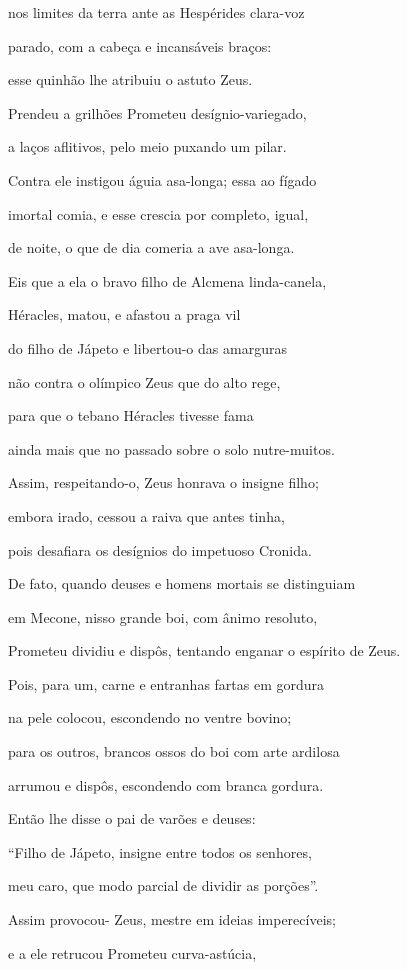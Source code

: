 \begin{pages}
\begin{Rightside}
nos limites da terra ante as Hespérides clara-voz

parado, com a cabeça e incansáveis braços:

esse quinhão lhe atribuiu o astuto Zeus. 

Prendeu a grilhões Prometeu desígnio-variegado,

a laços aflitivos, pelo meio puxando um pilar.

Contra ele instigou águia asa-longa; essa ao fígado

imortal comia, e esse crescia por completo, igual,

de noite, o que de dia comeria a ave asa-longa. 

Eis que a ela o bravo filho de Alcmena linda-canela,

Héracles, matou, e afastou a praga vil

do filho de Jápeto e libertou-o das amarguras

não contra o olímpico Zeus que do alto rege,

para que o tebano Héracles tivesse fama 

ainda mais que no passado sobre o solo nutre-muitos.

Assim, respeitando-o, Zeus honrava o insigne filho;

embora irado, cessou a raiva que antes tinha,

pois desafiara os desígnios do impetuoso Cronida.

\quad{}De fato, quando deuses e homens mortais se distinguiam 

em Mecone, nisso grande boi, com ânimo resoluto,

Prometeu dividiu e dispôs, tentando enganar o espírito de Zeus.

Pois, para um, carne e entranhas fartas em gordura

na pele colocou, escondendo no ventre bovino;

para os outros, brancos ossos do boi com arte ardilosa 

arrumou e dispôs, escondendo com branca gordura.

\quad{}Então lhe disse o pai de varões e deuses:

``Filho de Jápeto, insigne entre todos os senhores,

meu caro, que modo parcial de dividir as porções''.

\quad{}Assim provocou- Zeus, mestre em ideias imperecíveis; 

e a ele retrucou Prometeu curva-astúcia,


\end{Rightside}
\end{pages}
